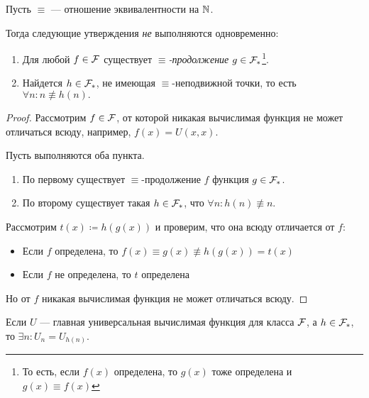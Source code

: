 \begin{lm}\label{lm:3}
	Пусть $ \equiv $ --- отношение эквивалентности на $ \mathbb{N}$. 

	\noindent
	Тогда следующие утверждения \textit{\large не} выполняются одновременно:
	\begin{enumerate}
		\item Для любой $ f \in \mathcal{F} $ существует \textit{$ \equiv $-продолжение} $  g \in \mathcal{F}_{*}$\footnote{То есть, если $ f(x) $ определена, то  $ g(x)$ тоже определена и $ g(x) \equiv f(x)$}.
		\item Найдется $  h \in \mathcal{F}_{*}$, не имеющая $ \equiv $-неподвижной точки, то есть 
			$ \forall n \colon  n \not\equiv h\left( n \right) .$
	\end{enumerate} 
\end{lm}
\begin{proof}
	Рассмотрим $ f \in \mathcal{F}$, от которой никакая вычислимая функция не может отличаться всюду, например, $ f(x) = U(x, x)$.

	Пусть выполняются оба пункта.
	\begin{enumerate}
	    \item По первому существует $ \equiv $-продолжение $ f$ функция $ g \in \mathcal{F}_{*}$.
		\item По второму существует такая $ h \in \mathcal{F}_{*}$, что $ \forall n \colon  h(n) \not\equiv n$.
	\end{enumerate} 

	Рассмотрим $ t(x) \coloneqq h(g(x))$ и проверим, что она всюду отличается от $ f$:
	\begin{itemize}
		\item Если $ f$ определена, то $ f(x) \equiv g(  x )  \not\equiv  h(g(x)) = t(x)$ 
		\item Если $ f$ не определена, то $ t$ определена
	\end{itemize}
	Но от $ f$ никакая вычислимая функция не может отличаться всюду.
\end{proof}
\begin{thm}
	Если $ U$ --- главная универсальная вычислимая функция для класса $ \mathcal{F}$, а $ h \in \mathcal{F}_{*}$, то $ \exists n \colon  U_n = U_{h(n)}$.
\end{thm}
